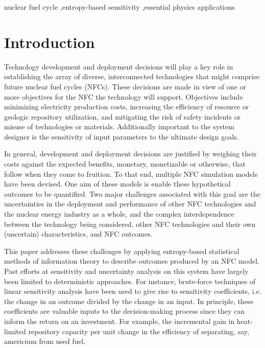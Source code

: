 \documentclass[preprint,12pt]{elsarticle}
\begin{document}
\begin{frontmatter}
\begin{keyword}
nuclear fuel cycle \sep entropy-based sensitivity \sep essential physics applications
\end{keyword}

\end{frontmatter}



\section{Introduction}
\label{sec:intro}

Technology development and deployment decisions will play a key role in
establishing the array of diverse, interconnected technologies that might comprise
future nuclear fuel cycles (NFCs).  These decisions are made in view of one or more
objectives for the NFC the technology will support.  Objectives include minimizing
electricity production costs, increasing the efficiency of resource or geologic
repository utilization, and mitigating the risk of safety incidents or misuse of
technologies or materials.  Additionally important to the system designer is the sensitivity 
of input parameters to the ultimate design goals.  

In general, development and deployment decisions are justified by weighing their costs 
against the expected benefits, monetary, monetizable or otherwise, that follow when they 
come to fruition.  To that end, multiple NFC simulation models  \cite{Jacobson2009, GENIUS1} 
have been devised.  One aim of these models is enable these hypothetical outcomes to be quantified.  
Two major challenges associated with this goal are the uncertainties in the deployment and performance 
of other NFC technologies and the nuclear energy industry as a whole, and the complex 
interdependence between the technology being considered, other NFC technologies and their 
own (uncertain) characteristics, and NFC outcomes.

This paper addresses these challenges by applying entropy-based statistical methods of information
theory to describe outcomes produced by an NFC model.  Past efforts at sensitivity and uncertainty
analysis on this system have largely been limited to deterministic approaches.  For instance,
brute-force techniques of linear sensitivity analysis have been used to give rise to sensitivity
coefficients, i.e. the change in an outcome divided by the change in an input.  In principle, these
coefficients are valuable inputs to the decision-making process since they can inform the
return on an investment.  For example, the incremental gain in heat-limited repository capacity per
unit change in the efficiency of separating, say, americium from used fuel.
\end{document}

